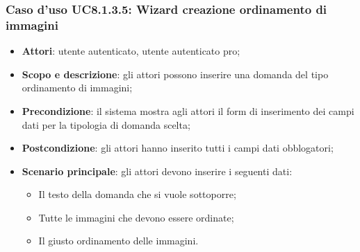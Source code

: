\subsubsection{Caso d’uso UC8.1.3.5: Wizard creazione ordinamento di immagini}
\begin{itemize}
	\item\textbf{Attori}: utente autenticato, utente autenticato pro;
	\item\textbf{Scopo e descrizione}: gli attori possono inserire una domanda del tipo ordinamento di immagini;
	\item\textbf{Precondizione}: il sistema mostra agli attori il form di inserimento dei campi dati per la tipologia di domanda scelta; 
	\item \textbf{Postcondizione}: gli attori hanno inserito tutti i campi dati obblogatori;
	\item\textbf{Scenario principale}: gli attori devono inserire i seguenti dati:
	\begin{itemize}
		\item Il testo della domanda che si vuole sottoporre;
		\item Tutte le immagini che devono essere ordinate;
		\item Il giusto ordinamento delle immagini.
	\end{itemize}
\end{itemize}